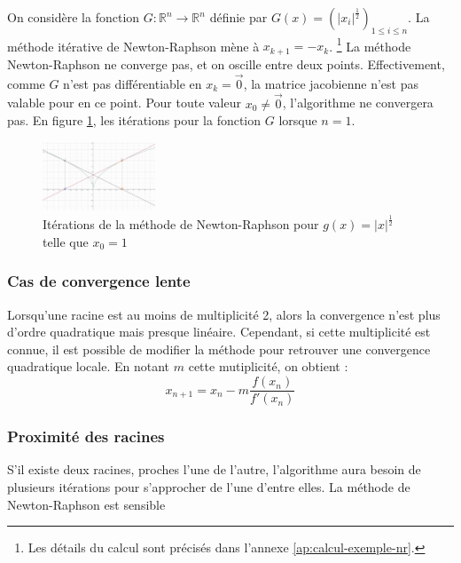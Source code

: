 \documentclass[3p, twocolumn]{elsarticle}
\begin{document}
\begin{exemple}
    On considère la fonction $G:\mathbb R^n\rightarrow \mathbb R^n$ définie par $G(x)=\left(\lvert x_i\rvert^{\frac12}\right)_{1\leq i\leq n}$. La méthode itérative de Newton-Raphson mène à $x_{k+1}=-x_k$. \footnote{Les détails du calcul sont précisés dans l'annexe \ref{ap:calcul-exemple-nr}.}
    \label{ex:newton-raphson-non-differentiable}
    La méthode Newton-Raphson ne converge pas, et on oscille entre deux points. Effectivement, comme $G$ n'est pas différentiable en $x_k=\overrightarrow 0$, la matrice jacobienne n'est pas valable pour en ce point. Pour toute valeur $x_0\neq \overrightarrow 0$, l'algorithme ne convergera pas. En figure \ref{fig:nr-iterations-2}, les itérations pour la fonction $G$ lorsque $n=1$.
    \begin{figure}[htbp]
        \centering
        \includegraphics[width = 0.3\textwidth]{iteration-newton-2.png}
        \caption{Itérations de la méthode de Newton-Raphson pour $g(x) = \lvert x \rvert ^{\frac12}$ telle que $x_0 = 1$}
        \label{fig:nr-iterations-2}
    \end{figure}
\end{exemple}

\subsubsection{Cas de convergence lente}
Lorsqu'une racine est au moins de multiplicité 2, alors la convergence n'est plus d'ordre quadratique mais presque linéaire. Cependant, si cette multiplicité est connue, il est possible de modifier la méthode pour retrouver une convergence quadratique locale. En notant $m$ cette mutiplicité, on obtient :
\begin{equation*}
    x_{n+1}=x_{n}-m\frac{f(x_{n})}{f'(x_{n})}    
\end{equation*}

\subsubsection{Proximité des racines}
S'il existe deux racines, proches l'une de l'autre, l'algorithme aura besoin de plusieurs itérations pour s'approcher de l'une d'entre elles. La méthode de Newton-Raphson est sensible 
\end{document}

